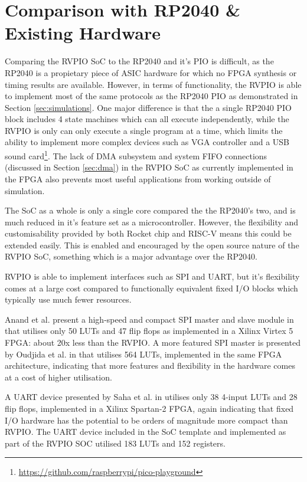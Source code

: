 \section{Comparison with RP2040 \& Existing Hardware}

Comparing the RVPIO SoC to the RP2040 and it's PIO is difficult, as the RP2040 is a propietary piece of ASIC hardware for which no FPGA synthesis or timing results are available. However, in terms of functionality, the RVPIO is able to implement most of the same protocols as the RP2040 PIO as demonstrated in Section \ref{sec:simulations}. One major difference is that the a single RP2040 PIO block includes 4 state machines which can all execute independently, while the RVPIO is only can only execute a single program at a time, which limits the ability to implement more complex devices such as VGA controller and a USB sound card\footnote{\url{https://github.com/raspberrypi/pico-playground}}. The lack of DMA subsystem and system FIFO connections (discussed in Section \ref{sec:dma}) in the RVPIO SoC as currently implemented in the FPGA also prevents most useful applications from working outside of simulation.

The SoC as a whole is only a single core compared the the RP2040's two, and is much reduced in it's feature set as a microcontroller. However, the flexibility and customisability provided by both Rocket chip and RISC-V means this could be extended easily. This is enabled and encouraged by the open source nature of the RVPIO SoC, something which is a major advantage over the RP2040.

RVPIO is able to implement interfaces such as SPI and UART, but it's flexibility comes at a large cost compared to functionally equivalent fixed I/O blocks which typically use much fewer resources.

Anand et al. present a high-speed and compact SPI master and slave module in \cite{spi-device} that utilises only 50 LUTs and 47 flip flops as implemented in a Xilinx Virtex 5 FPGA: about 20x less than the RVPIO. A more featured SPI master is presented by Oudjida et al. in \cite{spi-i2c} that utilises 564 LUTs, implemented in the same FPGA architecture, indicating that more features and flexibility in the hardware comes at a cost of higher utilisation.

A UART device presented by Saha et al. in \cite{uart-device} utilises only 38 4-input LUTs and 28 flip flops, implemented in a Xilinx Spartan-2 FPGA, again indicating that fixed I/O hardware has the potential to be orders of magnitude more compact than RVPIO. The UART device included in the SoC template and implemented as part of the RVPIO SOC utilised 183 LUTs and 152 registers.

